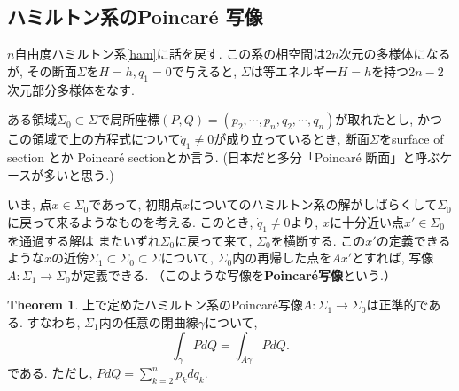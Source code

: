 \documentclass[a4paper]{ujarticle}
\numberwithin{equation}{section}
\theoremstyle{definition}
\newtheorem{theorem}{Theorem}
\begin{document}
    \subsection{ハミルトン系のPoincar\'{e} 写像}

    $n$自由度ハミルトン系\eqref{ham}に話を戻す.
    この系の相空間は$2n$次元の多様体になるが, その断面$\Sigma$を$H = h, q_1 = 0$で与えると, 
    $\Sigma$は等エネルギー$H = h$を持つ$2n - 2$次元部分多様体をなす.

    ある領域$\Sigma_0 \subset \Sigma$で局所座標$(P, Q) = (p_2, \cdots, p_n, q_2, \cdots, q_n)$が取れたとし,
    かつこの領域で上の方程式について$\dot{q}_1 \neq 0$が成り立っているとき, 
    断面$\Sigma$をsurface of section とか Poincar\'{e} sectionとか言う.
    (日本だと多分「Poincar\'{e} 断面」と呼ぶケースが多いと思う.)

    いま, 点$x \in \Sigma_0$であって, 
    初期点$x$についてのハミルトン系の解がしばらくして$\Sigma_0$に戻って来るようなものを考える.
    このとき, $\dot{q}_1 \neq 0$より, $x$に十分近い点$x' \in \Sigma_0$を通過する解は
    またいずれ$\Sigma_0$に戻って来て, $\Sigma_0$を横断する.
    この$x'$の定義できるような$x$の近傍$\Sigma_1 \subset \Sigma_0 \subset \Sigma$について, 
    $\Sigma_0$内の再帰した点を$Ax'$とすれば, 
    写像$A: \Sigma_1 \rightarrow \Sigma_0$が定義できる. 
    （このような写像を\textbf{Poincar\'{e}写像}という.）

    \begin{theorem}
        上で定めたハミルトン系のPoincar\'{e}写像$A: \Sigma_1 \rightarrow \Sigma_0$は正準的である.
        すなわち, $\Sigma_1$内の任意の閉曲線$\gamma$について, 
        \begin{equation} \label{A31.5}
            \int_{\gamma} P dQ = \int_{A \gamma} P dQ.
        \end{equation}
        である.
        ただし, $P dQ = \sum_{k = 2}^{n} p_k d q_k$.
    \end{theorem}
\end{document}

